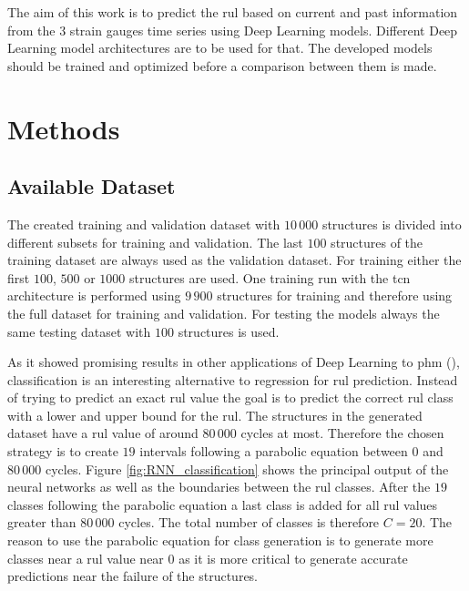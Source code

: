 \documentclass[conference]{IEEEtran}
\begin{document}
The aim of this work is to predict the \gls{rul} based on current and past information from the 3 strain gauges time series using Deep Learning models. Different Deep Learning model architectures are to be used for that. The developed models should be trained and optimized before a comparison between them is made.

\section{Methods}
\label{sec:methods}

\subsection{Available Dataset}
\label{sec:available_dataset}

The created training and validation dataset with $ 10\,000 $ structures is divided into different subsets for training and validation. The last $ 100 $ structures of the training dataset are always used as the validation dataset. For training either the first $ 100 $, $ 500 $ or $ 1000 $ structures are used. One training run with the \gls{tcn} architecture is performed using $ 9\,900 $ structures for training and therefore using the full dataset for training and validation. For testing the models always the same testing dataset with $ 100 $ structures is used.

As it showed promising results in other applications of Deep Learning to \gls{phm} (\cite{Liu2019a, Xiao2016}), classification is an interesting alternative to regression for \gls{rul} prediction. Instead of trying to predict an exact \gls{rul} value the goal is to predict the correct \gls{rul} class with a lower and upper bound for the \gls{rul}. The structures in the generated dataset have a \gls{rul} value of around $ 80\,000 $ cycles at most. Therefore the chosen strategy is to create $ 19 $ intervals following a parabolic equation between $ 0 $ and $ 80\,000 $ cycles. Figure \ref{fig:RNN_classification} shows the principal output of the neural networks as well as the boundaries between the \gls{rul} classes. After the $ 19 $ classes following the parabolic equation a last class is added for all \gls{rul} values greater than $ 80\,000 $ cycles. The total number of classes is therefore $ C = 20 $. The reason to use the parabolic equation for class generation is to generate more classes near a \gls{rul} value near $ 0 $ as it is more critical to generate accurate predictions near the failure of the structures.
\end{document}
